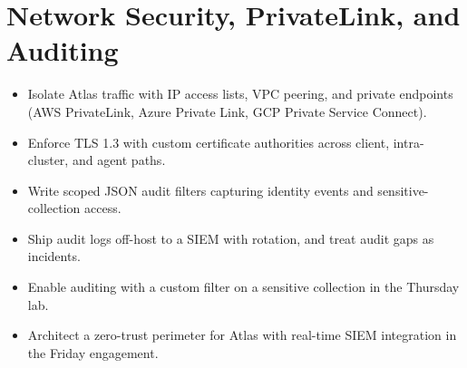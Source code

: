 \chapter{Network Security, PrivateLink, and Auditing}
%

\begin{objectives}
\begin{itemize}
    \item Isolate Atlas traffic with IP access lists, VPC peering, and private endpoints (AWS PrivateLink, Azure Private Link, GCP Private Service Connect).
    \item Enforce TLS 1.3 with custom certificate authorities across client, intra-cluster, and agent paths.
    \item Write scoped JSON audit filters capturing identity events and sensitive-collection access.
    \item Ship audit logs off-host to a SIEM with rotation, and treat audit gaps as incidents.
    \item Enable auditing with a custom filter on a sensitive collection in the Thursday lab.
    \item Architect a zero-trust perimeter for Atlas with real-time SIEM integration in the Friday engagement.
\end{itemize}
\end{objectives}

